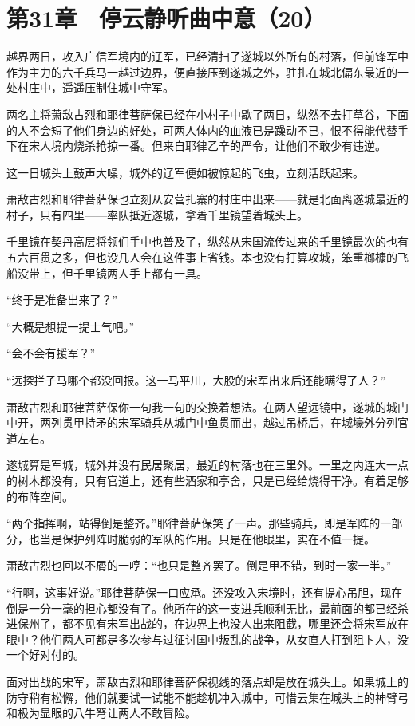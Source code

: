 \section{第31章　停云静听曲中意（20）}

越界两日，攻入广信军境内的辽军，已经清扫了遂城以外所有的村落，但前锋军中作为主力的六千兵马一越过边界，便直接压到遂城之外，驻扎在城北偏东最近的一处村庄中，遥遥压制住城中守军。

两名主将萧敌古烈和耶律菩萨保已经在小村子中歇了两日，纵然不去打草谷，下面的人不会短了他们身边的好处，可两人体内的血液已是躁动不已，恨不得能代替手下在宋人境内烧杀抢掠一番。但来自耶律乙辛的严令，让他们不敢少有违逆。

这一日城头上鼓声大噪，城外的辽军便如被惊起的飞虫，立刻活跃起来。

萧敌古烈和耶律菩萨保也立刻从安营扎寨的村庄中出来——就是北面离遂城最近的村子，只有四里——率队抵近遂城，拿着千里镜望着城头上。

千里镜在契丹高层将领们手中也普及了，纵然从宋国流传过来的千里镜最次的也有五六百贯之多，但也没几人会在这件事上省钱。本也没有打算攻城，笨重榔槺的飞船没带上，但千里镜两人手上都有一具。

“终于是准备出来了？”

“大概是想提一提士气吧。”

“会不会有援军？”

“远探拦子马哪个都没回报。这一马平川，大股的宋军出来后还能瞒得了人？”

萧敌古烈和耶律菩萨保你一句我一句的交换着想法。在两人望远镜中，遂城的城门中开，两列贯甲持矛的宋军骑兵从城门中鱼贯而出，越过吊桥后，在城壕外分列官道左右。

遂城算是军城，城外并没有民居聚居，最近的村落也在三里外。一里之内连大一点的树木都没有，只有官道上，还有些酒家和亭舍，只是已经给烧得干净。有着足够的布阵空间。

“两个指挥啊，站得倒是整齐。”耶律菩萨保笑了一声。那些骑兵，即是军阵的一部分，也当是保护列阵时脆弱的军队的作用。只是在他眼里，实在不值一提。

萧敌古烈也回以不屑的一哼：“也只是整齐罢了。倒是甲不错，到时一家一半。”

“行啊，这事好说。”耶律菩萨保一口应承。还没攻入宋境时，还有提心吊胆，现在倒是一分一毫的担心都没有了。他所在的这一支进兵顺利无比，最前面的都已经杀进保州了，都不见有宋军出战的，在边界上也没人出来阻截，哪里还会将宋军放在眼中？他们两人可都是多次参与过征讨国中叛乱的战争，从女直人打到阻卜人，没一个好对付的。

面对出战的宋军，萧敌古烈和耶律菩萨保视线的落点却是放在城头上。如果城上的防守稍有松懈，他们就要试一试能不能趁机冲入城中，可惜云集在城头上的神臂弓和极为显眼的八牛弩让两人不敢冒险。


